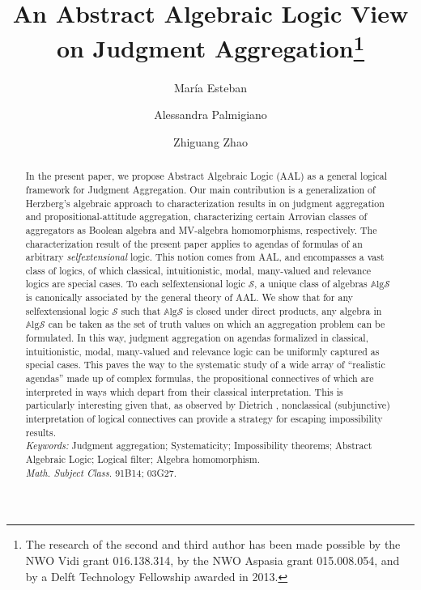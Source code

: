 \documentclass{llncs}
\numberwithin{equation}{section}
\newcommand{\Sm}{\mathcal{S}}   \newcommand{\Lm}{\mathcal{L}}  \newcommand{\Fm}{\mathbf{Fm}}  \newcommand{\Hom}{\mathrm{Hom}}   \newcommand{\Al}{\mathbf{A}}  \newcommand{\BB}{\mathbf{B}}   \newcommand{\Alg}{\mathbb{A}\mathrm{lg}}
\begin{document}
\mainmatter              		\pagestyle{headings}
\title{An Abstract Algebraic Logic View on Judgment Aggregation\thanks{The research of the second and third author has been made possible by the NWO Vidi grant 016.138.314, by the NWO Aspasia grant 015.008.054, and by a Delft Technology Fellowship awarded in 2013.}}
\author{Mar\'ia Esteban
\and
Alessandra Palmigiano
\and
 Zhiguang Zhao}

\maketitle
\thispagestyle{empty}

\begin{abstract}
In the present paper, we propose  Abstract Algebraic Logic (AAL) as a general logical framework for Judgment Aggregation. Our main contribution is a generalization of Herzberg's algebraic approach to characterization results in  on judgment aggregation and propositional-attitude aggregation, characterizing certain Arrovian classes of aggregators as Boolean algebra and MV-algebra homomorphisms, respectively.
 The characterization result of the present paper applies to  agendas of formulas of an arbitrary {\em selfextensional} logic.
This notion comes from AAL, and encompasses a vast class of logics, of which classical, intuitionistic, modal, many-valued and relevance logics are special cases. To each selfextensional logic $\Sm$, a unique class of algebras $\Alg\Sm$ is canonically associated by the general theory of AAL. We show that for any selfextensional logic $\Sm$ such that $\Alg\Sm$ is closed under direct products, any algebra in $\Alg\Sm$ can be taken as the set of truth values on which an aggregation problem can be formulated.
In this way, judgment aggregation on agendas formalized in  classical, intuitionistic, modal, many-valued and relevance logic can be uniformly captured as special cases.
This paves the way to the systematic study of a wide array of ``realistic agendas'' made up of complex formulas, the propositional connectives of which are interpreted in ways which depart from their classical interpretation.
This is particularly interesting given that, as observed by Dietrich \cite{Di10},  nonclassical (subjunctive) interpretation of logical connectives can provide a strategy for escaping impossibility results.\\
{\em Keywords:} Judgment aggregation; Systematicity; Impossibility theorems; Abstract Algebraic Logic; Logical filter; Algebra homomorphism.\\
{\em Math. Subject Class.} 91B14; 03G27.
\end{abstract}
\end{document}

